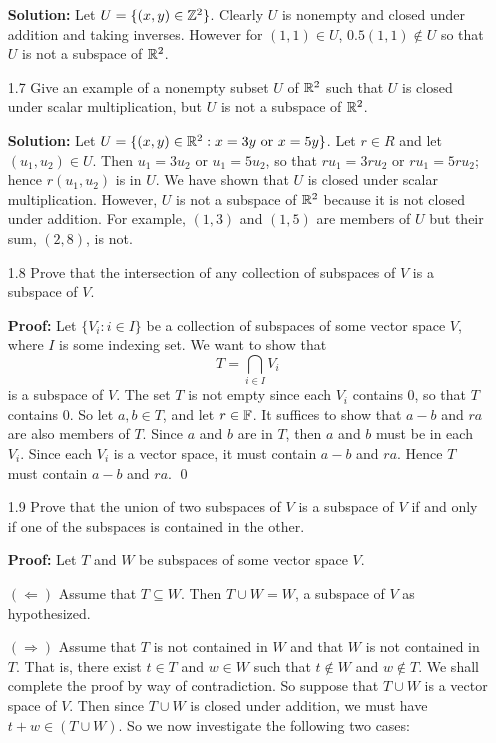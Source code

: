 \begin{enumerate}
      \textbf{Solution:} Let $U = \{(x, y) \in \mathbb{Z}^2\}$. Clearly $U$ is nonempty
      and closed under addition and taking inverses. However for $(1, 1) \in U$,
      $0.5(1, 1) \notin U$ so that $U$ is not a subspace of $\mathbb{R}^2$.
   \item[1.7]  Give an example of a nonempty subset $U$ of $\mathbb{R}^2$ such that $U$
               is closed under scalar multiplication, but $U$ is not a subspace
               of $\mathbb{R}^2$.

      \textbf{Solution:} Let
      $U = \{(x, y) \in \mathbb{R}^2 : x = 3y \mbox{ or } x = 5y\}$. Let $r \in R$ and
      let $(u_1, u_2) \in U$. Then $u_1 = 3u_2$ or $u_1 = 5u_2$, so that
      $ru_1 = 3ru_2$ or $ru_1 = 5ru_2$; hence $r(u_1, u_2)$ is in $U$. We have
      shown that $U$ is closed under scalar multiplication. However, $U$ is not
      a subspace of $\mathbb{R}^2$ because it is not closed under addition. For example,
      $(1, 3)$ and $(1, 5)$ are members of $U$ but their sum, $(2, 8)$, is not.
   \item[1.8]  Prove that the intersection of any collection of subspaces of $V$
               is a subspace of $V$.

      \textbf{Proof:} Let $\{V_i : i \in I\}$ be a collection of subspaces of
      some vector space $V$, where $I$ is some indexing set. We want to show
      that
      $$T = \bigcap_{i \in I} V_i$$
      is a subspace of $V$. The set $T$ is not empty since each $V_i$ contains
      0, so that $T$ contains 0. So let $a, b \in T$, and let $r \in \mathbb{F}$. It
      suffices to show that $a - b$ and $ra$ are also members of $T$. Since
      $a$ and $b$ are in $T$, then $a$ and $b$ must be in each $V_i$. Since each
      $V_i$ is a vector space, it must contain $a - b$ and $ra$. Hence $T$ must
      contain $a - b$ and $ra$. \qed
   \item[1.9]  Prove that the union of two subspaces of $V$ is a subspace of $V$
               if and only if one of the subspaces is contained in the other.

      \textbf{Proof:} Let $T$ and $W$ be subspaces of some vector space $V$.

      $(\Leftarrow)$ Assume that $T \subseteq W$. Then $T \cup W = W$, a
      subspace of $V$ as hypothesized.

      $(\Rightarrow)$ Assume that $T$ is not contained in $W$ and that $W$ is 
      not contained in $T$. That is, there exist $t \in T$ and $w \in W$ such
      that $t \notin W$ and $w \notin T$. We shall complete the proof by way of
      contradiction. So suppose that $T \cup W$ is a vector space of $V$. Then
      since $T \cup W$ is closed under addition, we must have
      $t + w \in (T \cup W)$. So we now investigate the following two cases:


\end{enumerate}
